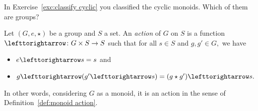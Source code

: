 \documentclass[../main/CT4S-EN-RU]{subfiles}
\begin{document}
\begin{exerciseRUS}\label{exc:permutation}
\end{exerciseRUS}

\begin{exerciseENG}
In Exercise~\ref{exc:classify cyclic} you classified the cyclic monoids. Which of them are groups? 
\end{exerciseENG}

\begin{exerciseRUS}
\end{exerciseRUS}

\begin{definitionENG}\label{def:group action}
Let $(G,e,\star)$ be a group and $S$ a set. An {\em action} of $G$ on $S$ is a function $\acts\taking G\times S\to S$ such that for all $s\in S$ and $g,g'\in G,$ we have
\begin{itemize}
\item $e\acts s=s$ and
\item $g\acts(g'\acts s)=(g\star g')\acts s.$
\end{itemize}
In other words, considering $G$ as a monoid, it is an action in the sense of Definition~\ref{def:monoid action}.
\end{definitionENG}

\begin{definitionRUS}\label{def:group action}
\end{definitionRUS}
\end{document}
